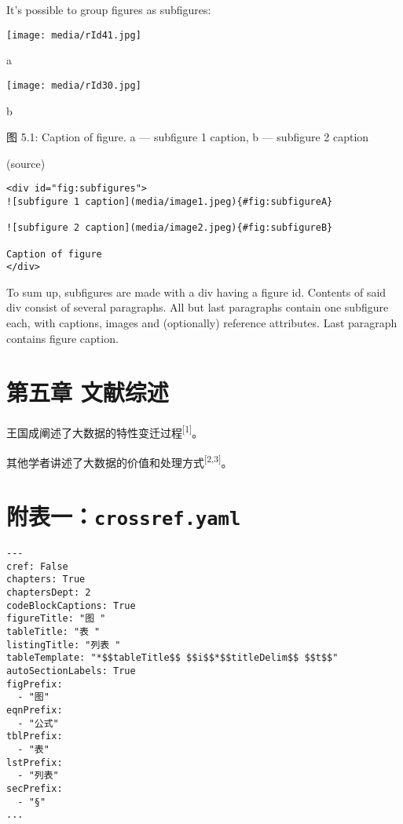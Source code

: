 \documentclass[
]{article}
\begin{document}
It's possible to group figures as subfigures:

\texttt{[image: media/rId41.jpg]}

a

\texttt{[image: media/rId30.jpg]}

b

图 5.1: Caption of figure. a --- subfigure 1 caption, b --- subfigure 2
caption

(source)

\begin{verbatim}
<div id="fig:subfigures">
![subfigure 1 caption](media/image1.jpeg){#fig:subfigureA}

![subfigure 2 caption](media/image2.jpeg){#fig:subfigureB}

Caption of figure
</div>
\end{verbatim}

To sum up, subfigures are made with a div having a figure id. Contents
of said div consist of several paragraphs. All but last paragraphs
contain one subfigure each, with captions, images and (optionally)
reference attributes. Last paragraph contains figure caption.

\hypertarget{ux7b2cux4e94ux7ae0-ux6587ux732eux7efcux8ff0}{%
\section{第五章
文献综述}\label{ux7b2cux4e94ux7ae0-ux6587ux732eux7efcux8ff0}}

王国成阐述了大数据的特性变迁过程\textsuperscript{{[}1{]}}。

其他学者讲述了大数据的价值和处理方式\textsuperscript{{[}2,3{]}}。

\hypertarget{ux9644ux8868ux4e00crossref.yaml}{%
\section{\texorpdfstring{附表一：\texttt{crossref.yaml}}{附表一：crossref.yaml}}\label{ux9644ux8868ux4e00crossref.yaml}}

\begin{verbatim}
---
cref: False
chapters: True
chaptersDept: 2
codeBlockCaptions: True
figureTitle: "图 "
tableTitle: "表 "
listingTitle: "列表 "
tableTemplate: "*$$tableTitle$$ $$i$$*$$titleDelim$$ $$t$$"
autoSectionLabels: True
figPrefix:
  - "图"
eqnPrefix:
  - "公式"
tblPrefix:
  - "表"
lstPrefix:
  - "列表"
secPrefix:
  - "§"
...
\end{verbatim}
\end{document}
